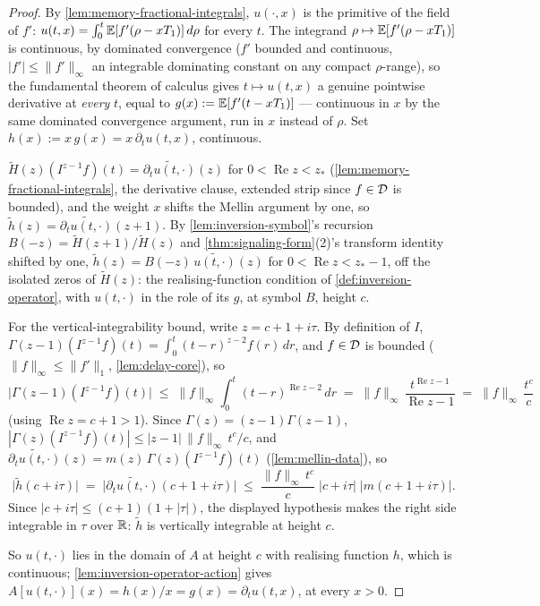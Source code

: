 \begin{proof}
By \ref{lem:memory-fractional-integrals}, $u(\cdot,x)$ is the primitive of the field of $f'$:
$u(t,x) = \int_0^t \mathbb{E}[f'(\rho - xT_1)]\,d\rho$ for every $t$. The integrand
$\rho \mapsto \mathbb{E}[f'(\rho-xT_1)]$ is continuous, by dominated convergence ($f'$ bounded and
continuous, $|f'| \le \|f'\|_\infty$ an integrable dominating constant on any compact $\rho$-range),
so the fundamental theorem of calculus gives $t \mapsto u(t,x)$ a genuine pointwise derivative at
\emph{every} $t$, equal to $g(x) := \mathbb{E}[f'(t-xT_1)]$ --- continuous in $x$ by the same dominated
convergence argument, run in $x$ instead of $\rho$. Set $h(x) := x\,g(x) = x\,\partial_t u(t,x)$,
continuous.

$\tilde H(z)(I^{z-1}f)(t) = \widetilde{\partial_t u(t,\cdot)}(z)$ for $0 < \operatorname{Re} z < z_*$
(\ref{lem:memory-fractional-integrals}, the derivative clause, extended strip since $f \in \mathcal{D}$
is bounded), and the weight $x$ shifts the Mellin argument by one, so
$\tilde h(z) = \widetilde{\partial_t u(t,\cdot)}(z+1)$. By \ref{lem:inversion-symbol}'s recursion
$B(-z) = \tilde H(z+1)/\tilde H(z)$ and \ref{thm:signaling-form}(2)'s transform identity shifted by
one, $\tilde h(z) = B(-z)\,\widetilde{u(t,\cdot)}(z)$ for $0 < \operatorname{Re} z < z_*-1$, off the isolated
zeros of $\tilde H(z)$: the realising-function condition of \ref{def:inversion-operator}, with
$u(t,\cdot)$ in the role of its $g$, at symbol $B$, height $c$.

For the vertical-integrability bound, write $z = c+1+i\tau$. By definition of $I$,
$\Gamma(z-1)(I^{z-1}f)(t) = \int_0^t (t-r)^{z-2}f(r)\,dr$, and $f \in \mathcal{D}$ is bounded
($\|f\|_\infty \le \|f'\|_1$, \ref{lem:delay-core}), so
\[
\bigl|\Gamma(z-1)(I^{z-1}f)(t)\bigr| \;\le\; \|f\|_\infty \int_0^t (t-r)^{\operatorname{Re} z - 2}\,dr
\;=\; \|f\|_\infty\,\frac{t^{\operatorname{Re} z - 1}}{\operatorname{Re} z - 1} \;=\; \|f\|_\infty\,\frac{t^{c}}{c}
\]
(using $\operatorname{Re} z = c+1 > 1$). Since $\Gamma(z) = (z-1)\Gamma(z-1)$,
$|\Gamma(z)(I^{z-1}f)(t)| \le |z-1|\,\|f\|_\infty\,t^c/c$, and
$\widetilde{\partial_t u(t,\cdot)}(z) = m(z)\,\Gamma(z)(I^{z-1}f)(t)$ (\ref{lem:mellin-data}), so
\[
\bigl|\tilde h(c+i\tau)\bigr| \;=\; \bigl|\widetilde{\partial_t u(t,\cdot)}(c+1+i\tau)\bigr|
\;\le\; \frac{\|f\|_\infty\,t^c}{c}\;|c+i\tau|\;\bigl|m(c+1+i\tau)\bigr|.
\]
Since $|c+i\tau| \le (c+1)(1+|\tau|)$, the displayed hypothesis makes the right side integrable in
$\tau$ over $\mathbb{R}$: $\tilde h$ is vertically integrable at height $c$.

So $u(t,\cdot)$ lies in the domain of $A$ at height $c$ with realising function $h$, which is
continuous; \ref{lem:inversion-operator-action} gives
$A[u(t,\cdot)](x) = h(x)/x = g(x) = \partial_t u(t,x)$, at every $x > 0$.
\end{proof}


